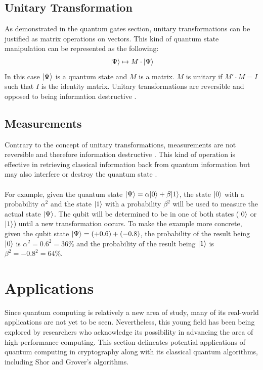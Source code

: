 \documentclass[12pt]{third-rep}
\begin{document}
\section{Unitary Transformation}
As demonstrated in the quantum gates section, unitary transformations can be justified as matrix operations on vectors. This kind of quantum state manipulation can be represented as the following:
$${\left\vert{\Psi}\right\rangle}\mapsto M\cdot{\left\vert{\Psi}\right\rangle}$$
In this case ${\left\vert{\Psi}\right\rangle}$ is a quantum state and $M$ is a matrix. $M$ is unitary if $M'\cdot M=I$ such that $I$ is the identity matrix. Unitary transformations are reversible and opposed to being information destructive \cite{non-qc}.

\section{Measurements}
Contrary to the concept of unitary transformations, measurements are not reversible and therefore information destructive \cite{non-qc}. This kind of operation is effective in retrieving classical information back from quantum information but may also interfere or destroy the quantum state \cite{measure}. \\\\
For example, given the quantum state ${\left\vert{\Psi}\right\rangle}=\alpha{\left\vert{0}\right\rangle}+\beta{\left\vert{1}\right\rangle}$, the state ${\left\vert{0}\right\rangle}$ with a probability $\alpha^2$ and the state ${\left\vert{1}\right\rangle}$ with a probability $\beta^2$ will be used to measure the actual state ${\left\vert{\Psi}\right\rangle}$. The qubit will be determined to be in one of both states (${\left\vert{0}\right\rangle}$ or ${\left\vert{1}\right\rangle}$) until a new transformation occurs. To make the example more concrete, given the qubit state ${\left\vert{\Psi}\right\rangle}=(+0.6)+(-0.8)$, the probability of the result being ${\left\vert{0}\right\rangle}$ is $\alpha^2=0.6^2=36\%$ and the probability of the result being ${\left\vert{1}\right\rangle}$ is $\beta^2=-0.8^2=64\%$.

\begingroup
\renewcommand{\cleardoublepage}{}
\renewcommand{\clearpage}{}
\chapter{Applications}
\endgroup

Since quantum computing is relatively a new area of study, many of its real-world applications are not yet to be seen. Nevertheless, this young field has been being explored by researchers who acknowledge its possibility in advancing the area of high-performance computing. This section delineates potential applications of quantum computing in cryptography along with its classical quantum algorithms, including Shor and Grover's algorithms.
\end{document}
